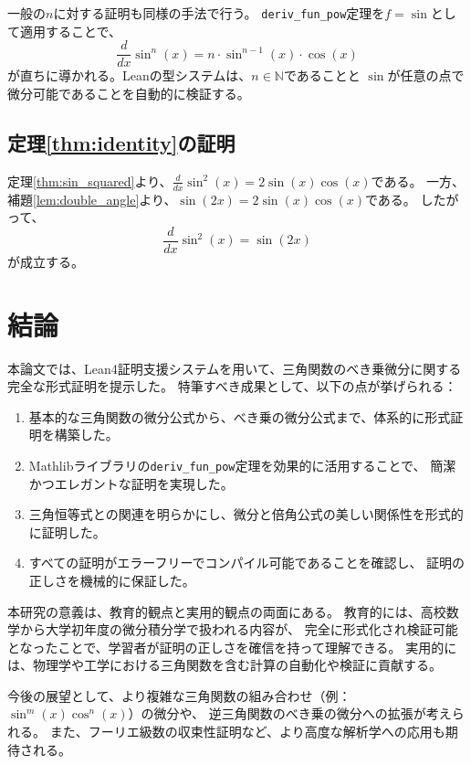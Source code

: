 \documentclass[uplatex, a4paper]{jlreq}
\begin{document}
一般の$n$に対する証明も同様の手法で行う。
\texttt{deriv\_fun\_pow}定理を$f = \sin$として適用することで、
\[
    \frac{d}{dx}\sin^n(x) = n \cdot \sin^{n-1}(x) \cdot \cos(x)
\]
が直ちに導かれる。Leanの型システムは、$n \in \mathbb{N}$であることと
$\sin$が任意の点で微分可能であることを自動的に検証する。

\subsection{定理\ref{thm:identity}の証明}

定理\ref{thm:sin_squared}より、$\frac{d}{dx}\sin^2(x) = 2\sin(x)\cos(x)$である。
一方、補題\ref{lem:double_angle}より、$\sin(2x) = 2\sin(x)\cos(x)$である。
したがって、
\[
    \frac{d}{dx}\sin^2(x) = \sin(2x)
\]
が成立する。

\section{結論}

本論文では、Lean4証明支援システムを用いて、三角関数のべき乗微分に関する完全な形式証明を提示した。
特筆すべき成果として、以下の点が挙げられる：

\begin{enumerate}
    \item 基本的な三角関数の微分公式から、べき乗の微分公式まで、体系的に形式証明を構築した。
    \item Mathlibライブラリの\texttt{deriv\_fun\_pow}定理を効果的に活用することで、
          簡潔かつエレガントな証明を実現した。
    \item 三角恒等式との関連を明らかにし、微分と倍角公式の美しい関係性を形式的に証明した。
    \item すべての証明がエラーフリーでコンパイル可能であることを確認し、
          証明の正しさを機械的に保証した。
\end{enumerate}

本研究の意義は、教育的観点と実用的観点の両面にある。
教育的には、高校数学から大学初年度の微分積分学で扱われる内容が、
完全に形式化され検証可能となったことで、学習者が証明の正しさを確信を持って理解できる。
実用的には、物理学や工学における三角関数を含む計算の自動化や検証に貢献する。

今後の展望として、より複雑な三角関数の組み合わせ（例：$\sin^m(x)\cos^n(x)$）の微分や、
逆三角関数のべき乗の微分への拡張が考えられる。
また、フーリエ級数の収束性証明など、より高度な解析学への応用も期待される。
\end{document}
